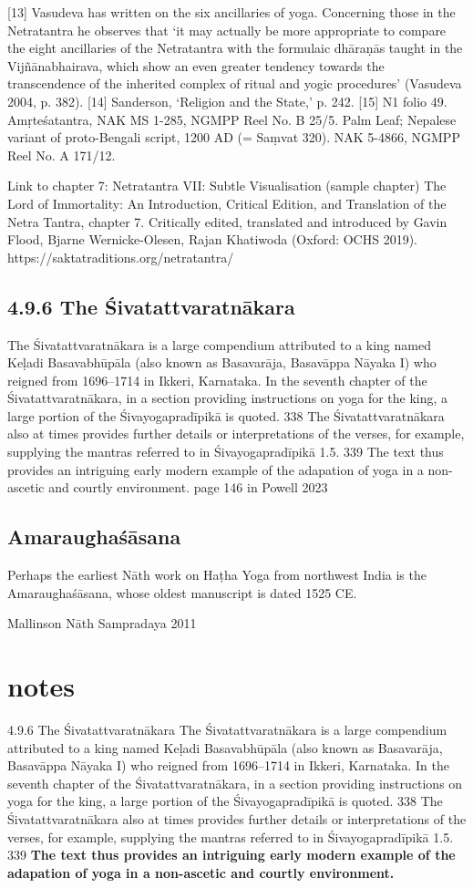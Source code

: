 [13] Vasudeva has written on the six ancillaries of yoga. Concerning those in the Netratantra he observes that ‘it may actually be more appropriate to compare the eight ancillaries of the Netratantra with the formulaic dhāraṇās taught in the Vijñānabhairava, which show an even greater tendency towards the transcendence of the inherited complex of ritual and yogic procedures’ (Vasudeva 2004, p. 382).
[14] Sanderson, ‘Religion and the State,’ p. 242.
[15] N1 folio 49. Amṛteśatantra, NAK MS 1-285, NGMPP Reel No. B 25/5. Palm Leaf; Nepalese variant of proto-Bengali script, 1200 AD (= Saṃvat 320). NAK 5-4866, NGMPP Reel No. A 171/12.

Link to chapter 7: Netratantra VII: Subtle Visualisation (sample chapter)
The Lord of Immortality: An Introduction, Critical Edition, and Translation of the Netra Tantra, chapter 7. Critically edited, translated and introduced by Gavin Flood, Bjarne Wernicke-Olesen, Rajan Khatiwoda (Oxford: OCHS 2019).
https://saktatraditions.org/netratantra/

\section{4.9.6 The Śivatattvaratnākara}
The Śivatattvaratnākara is a large compendium attributed to a king named Keḷadi Basavabhūpāla (also
known as Basavarāja, Basavāppa Nāyaka I) who reigned from 1696–1714 in Ikkeri, Karnataka. In the
seventh chapter of the Śivatattvaratnākara, in a section providing instructions on yoga for the king, a
large portion of the Śivayogapradīpikā is quoted. 338 The Śivatattvaratnākara also at times provides
further details or interpretations of the verses, for example, supplying the mantras referred to in
Śivayogapradīpikā 1.5. 339 The text thus provides an intriguing early modern example of the adapation of
yoga in a non-ascetic and courtly environment. page 146 in Powell 2023

\section{Amaraughaśāsana}

Perhaps the earliest Nāth work on Haṭha Yoga
from northwest India is the Amaraughaśāsana,
whose oldest manuscript is dated 1525 CE.

Mallinson Nāth Sampradaya 2011 
\chapter{notes}
4.9.6 The Śivatattvaratnākara
The Śivatattvaratnākara is a large compendium attributed to a king named Keḷadi Basavabhūpāla (also
known as Basavarāja, Basavāppa Nāyaka I) who reigned from 1696–1714 in Ikkeri, Karnataka. In the
seventh chapter of the Śivatattvaratnākara, in a section providing instructions on yoga for the king, a
large portion of the Śivayogapradīpikā is quoted. 338 The Śivatattvaratnākara also at times provides
further details or interpretations of the verses, for example, supplying the mantras referred to in
Śivayogapradīpikā 1.5. 339 \textbf{The text thus provides an intriguing early modern example of the adapation of
yoga in a non-ascetic and courtly environment.}

